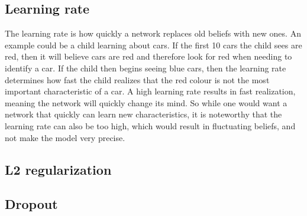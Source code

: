 \subsection{Learning rate}
The learning rate is how quickly a network replaces old beliefs with new ones. An example could be a child learning about cars. If the first 10 cars the child sees are red, then it will believe cars are red and therefore look for red when needing to identify a car. If the child then begins seeing blue cars, then the learning rate determines how fast the child realizes that the red colour is not the most important characteristic of a car. A high learning rate results in fast realization, meaning the network will quickly change its mind. So while one would want a network that quickly can learn new characteristics, it is noteworthy that the learning rate can also be too high, which would result in fluctuating beliefs, and not make the model very precise. 

\subsection{L2 regularization}



\subsection{Dropout}





